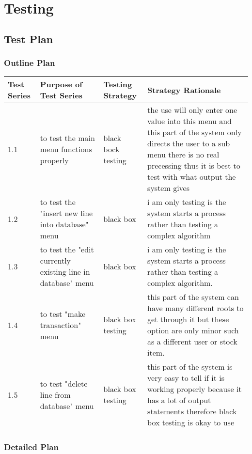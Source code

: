 \chapter{Testing}

\section{Test Plan}

\begin{landscape}

\subsection{Outline Plan}

\begin{center}
    \begin{tabular}{|p{2cm}|p{5cm}|p{5cm}|p{4cm}|}
        \hline
        \textbf{Test Series} & \textbf{Purpose of Test Series} & \textbf{Testing Strategy} & \textbf{Strategy Rationale}\\  \hline
        1.1 & to test the main menu functions properly  & black bock testing & the use will only enter one value into this menu and this part of the system only directs the user to a sub menu there is no real precessing thus it is best to test with what output the system gives \\ \hline
1.2 &to test the "insert new line into database" menu & black box & i am only testing is the system starts a process rather than testing a complex algorithm\\ \hline
1.3 & to test the "edit currently existing line in database" menu & black box &  i am only testing is the system starts a process rather than testing a complex algorithm. \\ \hline
1.4 & to test "make transaction" menu & black box testing & this part of the system can have many different roots to get through it but these option are only minor such as a different user or stock item. \\ \hline
1.5 & to test "delete line from database" menu & black box testing & this part of the system is very easy to tell if it is working properly because it has a lot of output statements therefore black box testing is okay to use \\ \hline
    \end{tabular}
\end{center}

\subsection{Detailed Plan}


\end{landscape}
